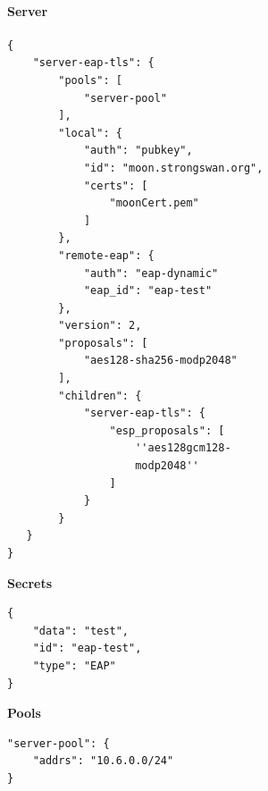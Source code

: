 \begin{minipage}[t]{0.5\textwidth}
\vspace{0pt}
\paragraph{Server}\mbox{}\medskip
\begin{lstlisting}[style=BashInputStyle]
{
    "server-eap-tls": {
        "pools": [
            "server-pool"
        ],
        "local": {
            "auth": "pubkey",
            "id": "moon.strongswan.org",
            "certs": [
                "moonCert.pem"
            ]
        },
        "remote-eap": {
            "auth": "eap-dynamic"
            "eap_id": "eap-test"
        },
        "version": 2,
        "proposals": [
            "aes128-sha256-modp2048"
        ],
        "children": {
            "server-eap-tls": {
                "esp_proposals": [
                    ''aes128gcm128-
                    modp2048''
                ]
            }
        }
   }
}
\end{lstlisting}
\hspace*{18pt}\textbf{Secrets}\mbox{}\medskip
\begin{lstlisting}[style=BashInputStyle]
{
    "data": "test",
    "id": "eap-test",
    "type": "EAP"
}
\end{lstlisting}
\hspace*{18pt}\textbf{Pools}\mbox{}\medskip
\begin{lstlisting}[style=BashInputStyle]
"server-pool": {
    "addrs": "10.6.0.0/24"
}
\end{lstlisting}
\end{minipage}
